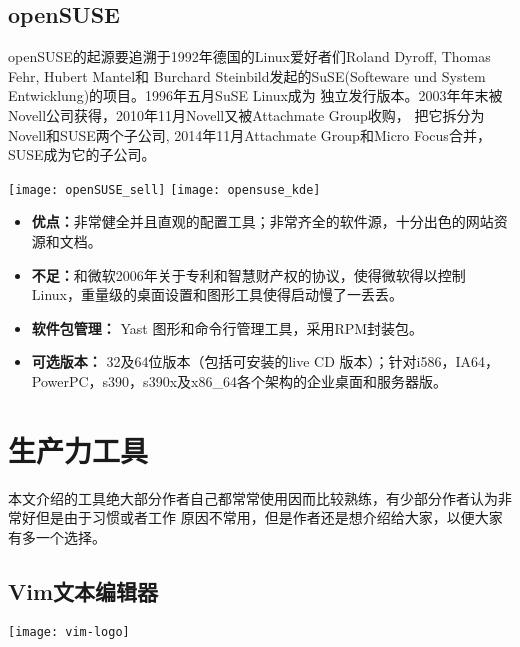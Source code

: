 \documentclass[11pt,fleqn]{book} %
\begin{document}
\subsection{openSUSE}

openSUSE的起源要追溯于1992年德国的Linux爱好者们Roland Dyroff, Thomas Fehr, Hubert Mantel和
Burchard Steinbild发起的SuSE(Softeware und System Entwicklung)的项目。1996年五月SuSE Linux成为
独立发行版本。2003年年末被Novell公司获得，2010年11月Novell又被Attachmate Group收购， 把它拆分为
Novell和SUSE两个子公司, 2014年11月Attachmate Group和Micro Focus合并，SUSE成为它的子公司。

\noindent
\texttt{[image: openSUSE\_sell]}
\texttt{[image: opensuse\_kde]}

\begin{itemize}
  \item \textbf{优点：}非常健全并且直观的配置工具；非常齐全的软件源，十分出色的网站资源和文档。
  \item \textbf{不足：}和微软2006年关于专利和智慧财产权的协议，使得微软得以控制Linux，重量级的桌面设置和图形工具使得启动慢了一丢丢。
  \item \textbf{软件包管理：} Yast 图形和命令行管理工具，采用RPM封装包。
  \item \textbf{可选版本：} 32及64位版本（包括可安装的live CD 版本）；针对i586，IA64，PowerPC，s390，s390x及x86\_64各个架构的企业桌面和服务器版。
\end{itemize}

\section{生产力工具}

本文介绍的工具绝大部分作者自己都常常使用因而比较熟练，有少部分作者认为非常好但是由于习惯或者工作
原因不常用，但是作者还是想介绍给大家，以便大家有多一个选择。
\subsection{Vim文本编辑器}

\begin{center}
\texttt{[image: vim-logo]}
\end{center}
\end{document}
